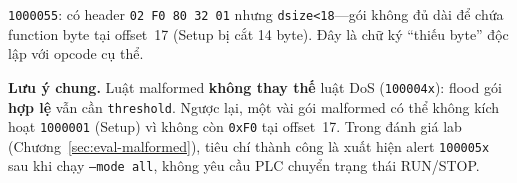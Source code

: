 \documentclass[../main.tex]{subfiles}
\begin{document}
\texttt{1000055}: có header \texttt{02 F0 80 32 01} nhưng \texttt{dsize<18}---gói không đủ dài để chứa function byte tại offset~17 (Setup bị cắt 14 byte). Đây là chữ ký ``thiếu byte'' độc lập với opcode cụ thể.

\noindent\textbf{Lưu ý chung.}
Luật malformed \textbf{không thay thế} luật DoS (\texttt{100004x}): flood gói \textbf{hợp lệ} vẫn cần \texttt{threshold}. Ngược lại, một vài gói malformed có thể không kích hoạt \texttt{1000001} (Setup) vì không còn \texttt{0xF0} tại offset~17. Trong đánh giá lab (Chương~\ref{sec:eval-malformed}), tiêu chí thành công là xuất hiện alert \texttt{100005x} sau khi chạy \texttt{--mode all}, không yêu cầu PLC chuyển trạng thái RUN/STOP.
\end{document}
